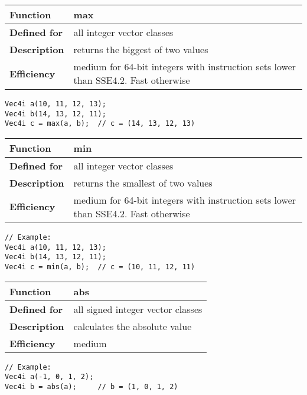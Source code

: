 \documentclass[vcl_manual.tex]{subfiles}
\begin{document}
\begin{tabular}{|p{25mm}|p{100mm}|}
\hline
\bfseries Function & max \\ \hline
\bfseries Defined for & all integer vector classes \\ \hline
\bfseries Description & returns the biggest of two values \\ \hline
\bfseries Efficiency & medium for 64-bit integers with instruction sets lower than SSE4.2. Fast otherwise \\ \hline
\end{tabular}
\begin{lstlisting}[frame=none]
Vec4i a(10, 11, 12, 13);
Vec4i b(14, 13, 12, 11);
Vec4i c = max(a, b);  // c = (14, 13, 12, 13)
\end{lstlisting}


\begin{tabular}{|p{25mm}|p{100mm}|}
\hline
\bfseries Function & min \\ \hline
\bfseries Defined for & all integer vector classes \\ \hline
\bfseries Description & returns the smallest of two values \\ \hline
\bfseries Efficiency & medium for 64-bit integers with instruction sets lower than SSE4.2. Fast otherwise \\ \hline
\end{tabular}
\begin{lstlisting}[frame=none]
// Example:
Vec4i a(10, 11, 12, 13);
Vec4i b(14, 13, 12, 11);
Vec4i c = min(a, b);  // c = (10, 11, 12, 11)
\end{lstlisting}


\begin{tabular}{|p{25mm}|p{100mm}|}
\hline
\bfseries Function & abs \\ \hline
\bfseries Defined for & all signed integer vector classes \\ \hline
\bfseries Description & calculates the absolute value \\ \hline
\bfseries Efficiency & medium \\ \hline
\end{tabular}
\begin{lstlisting}[frame=none]
// Example:
Vec4i a(-1, 0, 1, 2);
Vec4i b = abs(a);     // b = (1, 0, 1, 2)
\end{lstlisting}
\end{document}
